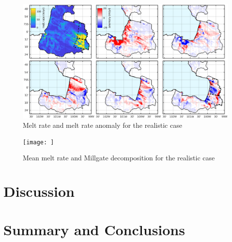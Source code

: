 \documentclass[draft]{agujournal2019}
\begin{document}
\begin{figure}
    \centering
    \includegraphics[width = \textwidth]{../make_figures/plots/figure11.eps}
    \caption{Melt rate and melt rate anomaly for the realistic case}
    \label{fig:figure11}
\end{figure}

\begin{figure}
    \centering
    \texttt{[image: ]}
    \caption{Mean melt rate and Millgate decomposition for the realistic case}
    \label{fig:figure12}
\end{figure}

\section{Discussion}

\section{Summary and Conclusions}



%

\end{document}
